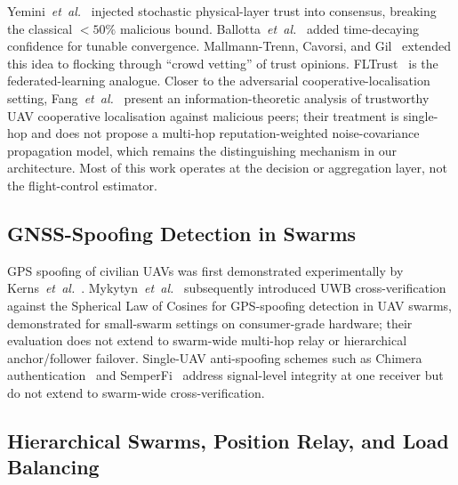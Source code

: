 \documentclass[journal,10pt,twocolumn]{IEEEtran}
\begin{document}
Yemini~\emph{et~al.}~\cite{yemini2022characterizing} injected stochastic physical-layer trust into consensus, breaking the classical $<\!50\%$ malicious bound. Ballotta~\emph{et~al.}~\cite{ballotta2025confidence} added time-decaying confidence for tunable convergence. Mallmann-Trenn, Cavorsi, and Gil~\cite{mallmanntrenn2022crowd} extended this idea to flocking through ``crowd vetting'' of trust opinions. FLTrust~\cite{cao2021fltrust} is the federated-learning analogue. Closer to the adversarial cooperative-localisation setting, Fang~\emph{et~al.}~\cite{fang2024trustworthy} present an information-theoretic analysis of trustworthy UAV cooperative localisation against malicious peers; their treatment is single-hop and does not propose a multi-hop reputation-weighted noise-covariance propagation model, which remains the distinguishing mechanism in our architecture. Most of this work operates at the decision or aggregation layer, not the flight-control estimator.

\subsection{GNSS-Spoofing Detection in Swarms}

GPS spoofing of civilian UAVs was first demonstrated experimentally by Kerns~\emph{et~al.}~\cite{kerns2014gpsspoofing}. Mykytyn~\emph{et~al.}~\cite{mykytyn2023gpsspoofing} subsequently introduced UWB cross-verification against the Spherical Law of Cosines for GPS-spoofing detection in UAV swarms, demonstrated for small-swarm settings on consumer-grade hardware; their evaluation does not extend to swarm-wide multi-hop relay or hierarchical anchor/follower failover. Single-UAV anti-spoofing schemes such as Chimera authentication~\cite{dai2023chimera} and SemperFi~\cite{sathaye2022semperfi} address signal-level integrity at one receiver but do not extend to swarm-wide cross-verification.

\subsection{Hierarchical Swarms, Position Relay, and Load Balancing}
\end{document}
